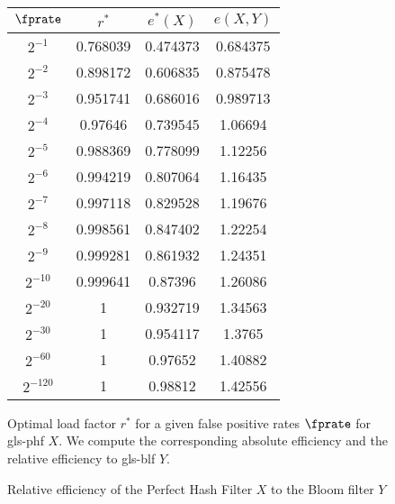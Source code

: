 \documentclass[ ../main.tex]{subfiles}
\begin{document}
\begin{figure}
\centering
\caption{Optimal load factor $r^*$ for a given false positive rates $\fprate$ for \gls{gls-phf} $X$. We compute the corresponding absolute efficiency and the relative efficiency to \gls{gls-blf} $Y$.}
\label{fig:abs_eff}
\begin{tabular}{c *{3}{S[table-auto-round,
                 table-format=-1.3]}}
{$\fprate$} & {$r^*$} & {$e^*(X)$} & {$e(X,Y)$}\\
\hline
$2^{-1}$  & 0.768039 & 0.474373 & 0.684375\\ 
$2^{-2}$  & 0.898172 & 0.606835 & 0.875478\\
$2^{-3}$  & 0.951741 & 0.686016 & 0.989713\\
$2^{-4}$  & 0.97646 & 0.739545 & 1.06694\\
$2^{-5}$  & 0.988369 & 0.778099 & 1.12256\\
$2^{-6}$  & 0.994219 & 0.807064 & 1.16435\\
$2^{-7}$  & 0.997118 & 0.829528 & 1.19676\\
$2^{-8}$  & 0.998561 & 0.847402 & 1.22254\\
$2^{-9}$  & 0.999281 & 0.861932 & 1.24351\\
$2^{-10}$ & 0.999641 & 0.87396 & 1.26086\\
$2^{-20}$ & 1 & 0.932719 & 1.34563\\
$2^{-30}$ & 1 & 0.954117 & 1.3765\\
$2^{-60}$ & 1 & 0.97652 & 1.40882\\
$2^{-120}$ & 1 & 0.98812 & 1.42556\\
\end{tabular}
\end{figure}

\begin{figure}
\caption{Relative efficiency of the Perfect Hash Filter $X$ to the Bloom filter $Y$}
\label{fig:rel_eff_bf_PHF}
\centering
{}
\end{figure}
\end{document}
